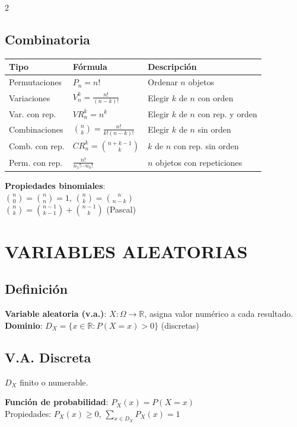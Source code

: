 \documentclass[9pt,a4paper]{article}
\begin{document}
\begin{multicols}{2}
\subsection{Combinatoria}
\begin{center}
\begin{tabular}{@{}lll@{}}
\textbf{Tipo} & \textbf{Fórmula} & \textbf{Descripción}\\
\hline
Permutaciones & $P_n=n!$ & Ordenar $n$ objetos\\
Variaciones & $V_n^k=\frac{n!}{(n-k)!}$ & Elegir $k$ de $n$ con orden\\
Var. con rep. & $VR_n^k=n^k$ & Elegir $k$ de $n$ con rep. y orden\\
Combinaciones & $\binom{n}{k}=\frac{n!}{k!(n-k)!}$ & Elegir $k$ de $n$ sin orden\\
Comb. con rep. & $CR_n^k=\binom{n+k-1}{k}$ & $k$ de $n$ con rep. sin orden\\
Perm. con rep. & $\frac{n!}{n_1!\cdots n_k!}$ & $n$ objetos con repeticiones
\end{tabular}
\end{center}

\textbf{Propiedades binomiales}:\\
$\binom{n}{0}=\binom{n}{n}=1$, \quad $\binom{n}{k}=\binom{n}{n-k}$\\
$\binom{n}{k}=\binom{n-1}{k-1}+\binom{n-1}{k}$ (Pascal)

\section{VARIABLES ALEATORIAS}

\subsection{Definición}
\textbf{Variable aleatoria (v.a.)}: $X:\Omega\to\mathbb{R}$, asigna valor numérico a cada resultado.\\
\textbf{Dominio}: $D_X=\{x\in\mathbb{R}: P(X=x)>0\}$ (discretas)

\subsection{V.A. Discreta}
$D_X$ finito o numerable.

\textbf{Función de probabilidad}: $P_X(x)=P(X=x)$\\
Propiedades: $P_X(x)\geq 0$, \quad $\sum_{x\in D_X}P_X(x)=1$


\end{multicols}
\end{document}
